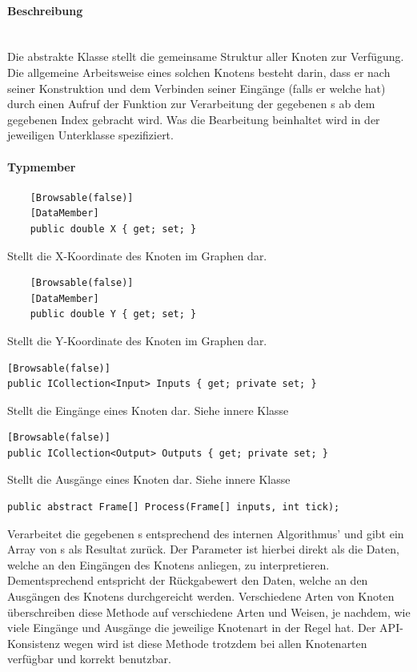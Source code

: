 \paragraph{Beschreibung}~\\
Die abstrakte Klasse  stellt die gemeinsame Struktur aller Knoten zur Verfügung. Die allgemeine Arbeitsweise eines solchen Knotens besteht darin, dass er nach seiner Konstruktion und dem Verbinden seiner Eingänge (falls er welche hat) durch einen Aufruf der Funktion  zur Verarbeitung der gegebenen s ab dem gegebenen Index gebracht wird. Was die Bearbeitung beinhaltet wird in der jeweiligen Unterklasse spezifiziert.

\paragraph{Typmember}
\begin{itemize}

	\begin{verbatim}
	[Browsable(false)]
	[DataMember]
	public double X { get; set; }
	\end{verbatim}
	Stellt die X-Koordinate des Knoten im Graphen dar.

	\begin{verbatim}
	[Browsable(false)]
	[DataMember]
	public double Y { get; set; }
	\end{verbatim}
	Stellt die Y-Koordinate des Knoten im Graphen dar.

	\begin{verbatim}
[Browsable(false)]
public ICollection<Input> Inputs { get; private set; }
	\end{verbatim}
Stellt die Eingänge eines Knoten dar. Siehe innere Klasse 

	\begin{verbatim}
[Browsable(false)]
public ICollection<Output> Outputs { get; private set; }
	\end{verbatim}
Stellt die Ausgänge eines Knoten dar. Siehe innere Klasse 

	\begin{verbatim}
public abstract Frame[] Process(Frame[] inputs, int tick);
	\end{verbatim}
	Verarbeitet die gegebenen s entsprechend des internen Algorithmus' und gibt ein Array von s als Resultat zurück. Der Parameter  ist hierbei direkt als die Daten, welche an den Eingängen des Knotens anliegen, zu interpretieren. Dementsprechend entspricht der Rückgabewert den Daten, welche an den Ausgängen des Knotens durchgereicht werden. Verschiedene Arten von Knoten überschreiben diese Methode auf verschiedene Arten und Weisen, je nachdem, wie viele Eingänge und Ausgänge die jeweilige Knotenart in der Regel hat. Der API-Konsistenz wegen wird ist diese Methode trotzdem bei allen Knotenarten verfügbar und korrekt benutzbar.


\end{itemize}

